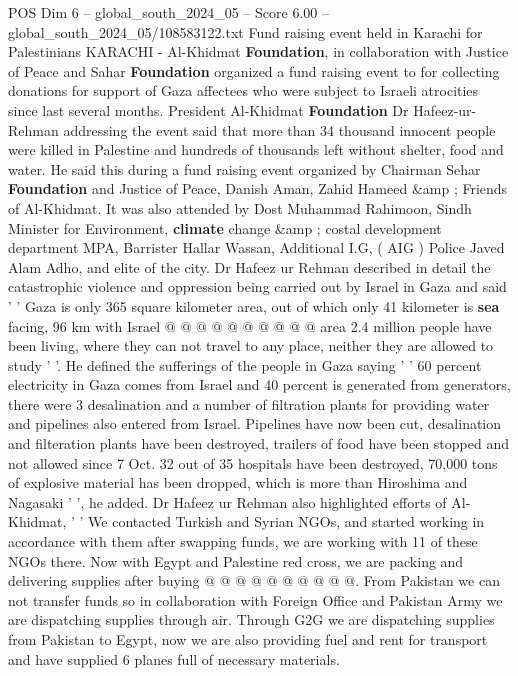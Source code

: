 \begin{textsample}{POS Dim 6 – global\_south\_2024\_05 – Score 6.00 – global\_south\_2024\_05/108583122.txt}  \label{ex:f6_pos_211}
Fund raising event held in Karachi for Palestinians KARACHI - Al-Khidmat \textbf{Foundation}, in collaboration with Justice of Peace and Sahar \textbf{Foundation} organized a fund raising event to for collecting donations for support of Gaza affectees who were subject to Israeli atrocities since last several months.
President Al-Khidmat \textbf{Foundation} Dr Hafeez-ur-Rehman addressing the event said that more than 34 thousand innocent people were killed in Palestine and hundreds of thousands left without shelter, food and water.
He said this during a fund raising event organized by Chairman Sehar \textbf{Foundation} and Justice of Peace, Danish Aman, Zahid Hameed \&amp ; Friends of Al-Khidmat.
It was also attended by Dost Muhammad Rahimoon, Sindh Minister for Environment, \textbf{climate} change \&amp ; costal development department MPA, Barrister Hallar Wassan, Additional I.G, ( AIG ) Police Javed Alam Adho, and elite of the city.
Dr Hafeez ur Rehman described in detail the catastrophic violence and oppression being carried out by Israel in Gaza and said ' ' Gaza is only 365 square kilometer area, out of which only 41 kilometer is \textbf{sea} facing, 96 km with Israel @ @ @ @ @ @ @ @ @ @ area 2.4 million people have been living, where they can not travel to any place, neither they are allowed to study ' '.
He defined the sufferings of the people in Gaza saying ' ' 60 percent electricity in Gaza comes from Israel and 40 percent is generated from generators, there were 3 desalination and a number of filtration plants for providing water and pipelines also entered from Israel.
Pipelines have now been cut, desalination and filteration plants have been destroyed, trailers of food have been stopped and not allowed since 7 Oct. 32 out of 35 hospitals have been destroyed, 70,000 tons of explosive material has been dropped, which is more than Hiroshima and Nagasaki ' ', he added.
Dr Hafeez ur Rehman also highlighted efforts of Al-Khidmat, ' ' We contacted Turkish and Syrian NGOs, and started working in accordance with them after swapping funds, we are working with 11 of these NGOs there.
Now with Egypt and Palestine red cross, we are packing and delivering supplies after buying @ @ @ @ @ @ @ @ @ @.
From Pakistan we can not transfer funds so in collaboration with Foreign Office and Pakistan Army we are dispatching supplies through air.
Through G2G we are dispatching supplies from Pakistan to Egypt, now we are also providing fuel and rent for transport and have supplied 6 planes full of necessary materials.

\end{textsample}
